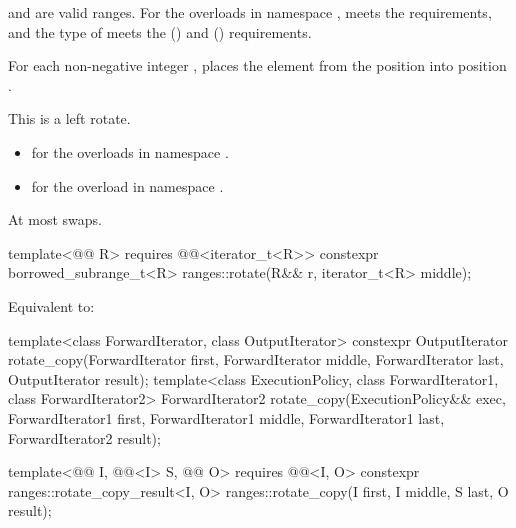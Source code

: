 \begin{itemdescr}
\pnum
\expects
{} and  are valid ranges.
For the overloads in namespace ,
 meets
the  requirements, and
the type of  meets
the  () and
 () requirements.

\pnum
\effects
For each non-negative integer ,
places the element from the position 
into position .
\begin{note}
This is a left rotate.
\end{note}

\pnum
\returns
\begin{itemize}
\item
  for the overloads in namespace .
\item
  for the overload in namespace .
\end{itemize}

\pnum
\complexity
At most  swaps.
\end{itemdescr}

\begin{itemdecl}
template<@@ R>
  requires @@<iterator_t<R>>
  constexpr borrowed_subrange_t<R> ranges::rotate(R&& r, iterator_t<R> middle);
\end{itemdecl}

\begin{itemdescr}
\pnum
\effects
Equivalent to:
\end{itemdescr}

%
\begin{itemdecl}
template<class ForwardIterator, class OutputIterator>
  constexpr OutputIterator
    rotate_copy(ForwardIterator first, ForwardIterator middle, ForwardIterator last,
                OutputIterator result);
template<class ExecutionPolicy, class ForwardIterator1, class ForwardIterator2>
  ForwardIterator2
    rotate_copy(ExecutionPolicy&& exec,
                ForwardIterator1 first, ForwardIterator1 middle, ForwardIterator1 last,
                ForwardIterator2 result);

  template<@@ I, @@<I> S, @@ O>
    requires @@<I, O>
    constexpr ranges::rotate_copy_result<I, O>
      ranges::rotate_copy(I first, I middle, S last, O result);
\end{itemdecl}

